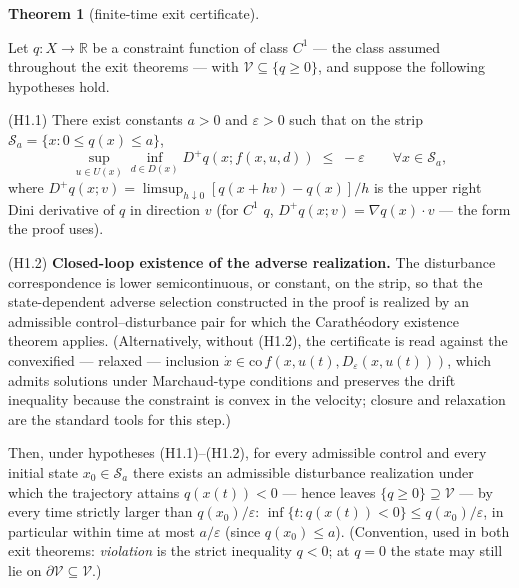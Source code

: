 \documentclass[11pt]{article}
\theoremstyle{definition}
\newtheorem{theorem}{Theorem}
\begin{document}
\begin{theorem}[finite-time exit certificate]\label{thm:exit}

Let \(q : X \to \mathbb{R}\) be a constraint function of class \(C^1\) --- the class assumed throughout the exit theorems --- with
\(\mathcal{V} \subseteq \{ q \ge 0 \}\), and suppose the following
hypotheses hold.

(H1.1) There exist constants \(a > 0\) and \(\varepsilon > 0\) such that
on the strip \(\mathcal{S}_a = \{ x : 0 \le q(x) \le a \}\),
\[\sup_{u \in U(x)} \inf_{d \in D(x)} D^+ q(x; f(x,u,d)) \;\le\; -\varepsilon \qquad \forall x \in \mathcal{S}_a, \tag{1}\]
where \(D^+ q(x; v) = \limsup_{h \downarrow 0} [q(x + hv) - q(x)]/h\) is
the upper right Dini derivative of \(q\) in direction \(v\) (for \(C^1\)
\(q\), \(D^+ q(x; v) = \nabla q(x) \cdot v\) --- the form the proof
uses).

(H1.2) \textbf{Closed-loop existence of the adverse realization.} The
disturbance correspondence is lower semicontinuous, or constant, on the
strip, so that the state-dependent adverse selection constructed in the
proof is realized by an admissible control--disturbance pair for which
the Carath\'eodory existence theorem applies. (Alternatively, without (H1.2), the certificate is read against the convexified ---
relaxed --- inclusion
\(\dot x \in \mathrm{co}\, f(x, u(t), D_{\varepsilon}(x, u(t)))\), which
admits solutions under Marchaud-type conditions and preserves the drift
inequality because the constraint is convex in the velocity; closure and
relaxation are the standard tools for this step.)

Then, under hypotheses (H1.1)--(H1.2), for every
admissible control and every initial state \(x_0 \in \mathcal{S}_a\)
there exists an admissible disturbance realization under which the
trajectory attains \(q(x(t)) < 0\) --- hence leaves
\(\{ q \ge 0 \} \supseteq \mathcal{V}\) --- by every time strictly
larger than \(q(x_0)/\varepsilon\):
\(\inf\{ t : q(x(t)) < 0 \} \le q(x_0)/\varepsilon\), in particular
within time at most \(a/\varepsilon\) (since \(q(x_0) \le a\)).
(Convention, used in both exit theorems: \emph{violation} is the strict
inequality \(q < 0\); at \(q = 0\) the state may still lie on
\(\partial \mathcal{V} \subseteq \mathcal{V}\).)

\end{theorem}
\end{document}
